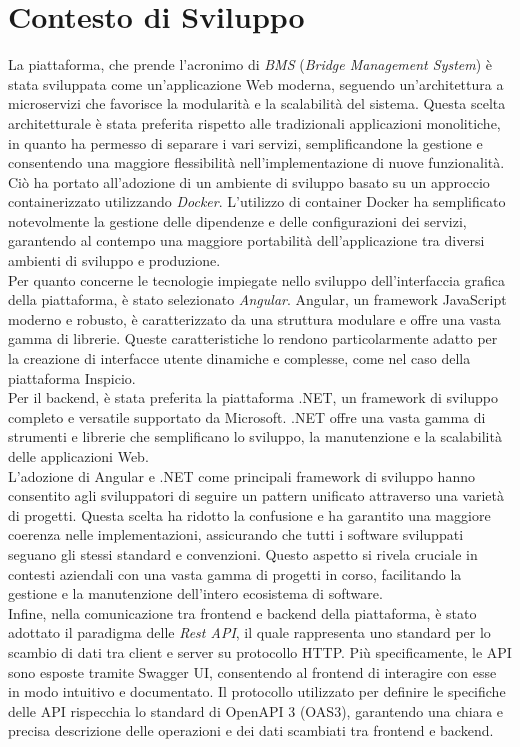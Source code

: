 \section{Contesto di Sviluppo}
La piattaforma, che prende l'acronimo di \textit{BMS} (\textit{Bridge Management System}) è stata sviluppata come un'applicazione Web moderna, seguendo un'architettura a microservizi che favorisce la modularità e la scalabilità del sistema. Questa scelta architetturale è stata preferita rispetto alle tradizionali applicazioni monolitiche, in quanto ha permesso di separare i vari servizi, semplificandone la gestione e consentendo una maggiore flessibilità nell'implementazione di nuove funzionalità.
Ciò ha portato all'adozione di un ambiente di sviluppo basato su un approccio containerizzato utilizzando \textit{Docker}. L'utilizzo di container Docker ha semplificato notevolmente la gestione delle dipendenze e delle configurazioni dei servizi, garantendo al contempo una maggiore portabilità dell'applicazione tra diversi ambienti di sviluppo e produzione.
\\Per quanto concerne le tecnologie impiegate nello sviluppo dell'interfaccia grafica della piattaforma, è stato selezionato \textit{Angular}. Angular, un framework JavaScript moderno e robusto, è caratterizzato da una struttura modulare e offre una vasta gamma di librerie. Queste caratteristiche lo rendono particolarmente adatto per la creazione di interfacce utente dinamiche e complesse, come nel caso della piattaforma Inspicio.
\\Per il backend, è stata preferita la piattaforma .NET, un framework di sviluppo completo e versatile supportato da Microsoft. .NET offre una vasta gamma di strumenti e librerie che semplificano lo sviluppo, la manutenzione e la scalabilità delle applicazioni Web.
\\L'adozione di Angular e .NET come principali framework di sviluppo hanno consentito agli sviluppatori di seguire un pattern unificato attraverso una varietà di progetti. Questa scelta ha ridotto la confusione e ha garantito una maggiore coerenza nelle implementazioni, assicurando che tutti i software sviluppati seguano gli stessi standard e convenzioni. Questo aspetto si rivela cruciale in contesti aziendali con una vasta gamma di progetti in corso, facilitando la gestione e la manutenzione dell'intero ecosistema di software.
\\Infine, nella comunicazione tra frontend e backend della piattaforma, è stato adottato il paradigma delle \textit{Rest API}, il quale rappresenta uno standard per lo scambio di dati tra client e server su protocollo HTTP. Più specificamente, le API sono esposte tramite Swagger UI, consentendo al frontend di interagire con esse in modo intuitivo e documentato. Il protocollo utilizzato per definire le specifiche delle API rispecchia lo standard di OpenAPI 3 (OAS3), garantendo una chiara e precisa descrizione delle operazioni e dei dati scambiati tra frontend e backend.

